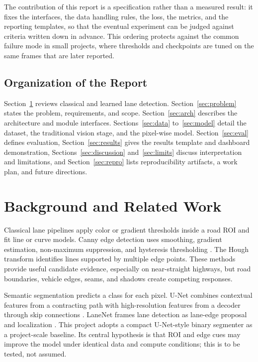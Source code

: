 \documentclass[10pt,a4paper,twocolumn]{article}
\begin{document}
The contribution of this report is a specification rather than a measured result: it fixes the interfaces, the data handling rules, the loss, the metrics, and the reporting templates, so that the eventual experiment can be judged against criteria written down in advance. This ordering protects against the common failure mode in small projects, where thresholds and checkpoints are tuned on the same frames that are later reported.

\subsection{Organization of the Report}
Section~\ref{sec:background} reviews classical and learned lane detection. Section~\ref{sec:problem} states the problem, requirements, and scope. Section~\ref{sec:arch} describes the architecture and module interfaces. Sections~\ref{sec:data} to~\ref{sec:model} detail the dataset, the traditional vision stage, and the pixel-wise model. Section~\ref{sec:eval} defines evaluation, Section~\ref{sec:results} gives the results template and dashboard demonstration, Sections~\ref{sec:discussion} and~\ref{sec:limits} discuss interpretation and limitations, and Section~\ref{sec:repro} lists reproducibility artifacts, a work plan, and future directions.

\section{Background and Related Work}\label{sec:background}
Classical lane pipelines apply color or gradient thresholds inside a road ROI and fit line or curve models. Canny edge detection uses smoothing, gradient estimation, non-maximum suppression, and hysteresis thresholding \cite{canny1986}. The Hough transform identifies lines supported by multiple edge points. These methods provide useful candidate evidence, especially on near-straight highways, but road boundaries, vehicle edges, seams, and shadows create competing responses.

Semantic segmentation predicts a class for each pixel. U-Net combines contextual features from a contracting path with high-resolution features from a decoder through skip connections \cite{ronneberger2015}. LaneNet frames lane detection as lane-edge proposal and localization \cite{neven2018a}. This project adopts a compact U-Net-style binary segmenter as a project-scale baseline. Its central hypothesis is that ROI and edge cues may improve the model under identical data and compute conditions; this is to be tested, not assumed.
\end{document}
